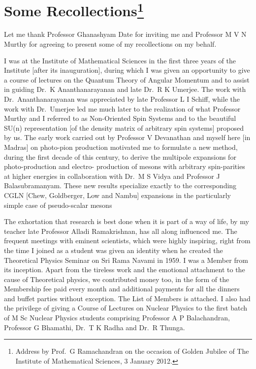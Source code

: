 \chapter[Some Recollections]{Some Recollections\footnote[*]{Address by Prof.\ G Ramachandran on the occasion of Golden Jubilee of The Institute of Mathematical Sciences, 3 January 2012.}}\label{chap2}

\medskip

Let me thank Professor Ghanashyam Date for inviting me and Professor M V N Murthy
for agreeing to present some of my recollections on my behalf.

I was at the Institute of Mathematical Sciences in the first three years of the
Institute [after its inauguration], during which I was given an opportunity to give
a course of lectures on the Quantum Theory of Angular Momentum and to assist
in guiding Dr.\ K Ananthanarayanan and late Dr.\ R K Umerjee. The work with Dr.\ 
Ananthanarayanan was appreciated by late Professor L I Schiff, while the work with
Dr.\ Umerjee led me much later to the realization of what Professor Murthy and I
referred to as Non-Oriented Spin Systems and to the beautiful SU(n) representation
[of the density matrix of arbitrary spin systems] proposed by us. The early work
carried out by Professor V Devanathan and myself here [in Madras] on photo-pion
production motivated me to formulate a new method, during the first decade of
this century, to derive the multipole expansions for photo-production and electro-
production of mesons with arbitrary spin-parities at higher energies in collaboration
with Dr.\ M S Vidya and Professor J Balasubramanyam. These new results specialize
exactly to the corresponding CGLN [Chew, Goldberger, Low and Nambu] expansions
in the particularly simple case of pseudo-scalar mesons

The exhortation that research is best done when it is part of a way of life, by
my teacher late Professor Alladi Ramakrishnan, has all along influenced me. The
frequent meetings with eminent scientists, which were highly inspiring, right from
the time I joined as a student was given an identity when he created the Theoretical
Physics Seminar on Sri Rama Navami in 1959. I was a Member from its inception.
Apart from the tireless work and the emotional attachment to the cause of\break 
Theoretical physics, we contributed money too, in the form of the Membership fee paid every
month and additional payments for all the dinners and buffet parties without exception. 
The List of Members is attached. I also had the privilege of giving a Course
of Lectures on Nuclear Physics to the first batch of M Sc Nuclear Physics students
comprising Professor A P Balachandran, Professor G Bhamathi, Dr.\ T K Radha and
Dr.\ R Thunga.

